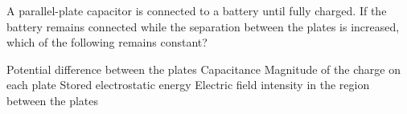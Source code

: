 \begin{questions}\setcounter{question}{15}\question
A parallel-plate capacitor is connected to a battery until fully charged. If the battery remains connected while the separation between the plates is increased, which of the following remains constant?

\begin{choices}
\choice Potential difference between the plates
\choice Capacitance
\choice Magnitude of the charge on each plate
\choice Stored electrostatic energy
\choice Electric field intensity in the region between the plates
\end{choices}\end{questions}
